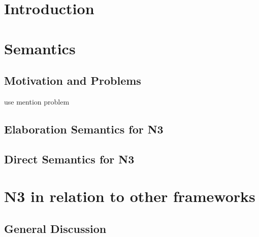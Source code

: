 \documentclass[11pt,a4paper,twoside]{book}
\newcommand\blankpage{%
    \null
    \thispagestyle{empty}%
    \addtocounter{page}{-1}%
    \newpage}
\theoremstyle{remark}
\begin{document}
    
    

    \printglossary[title=List of Abbreviations and Glossary] %

	


\mainmatter

\part{Introduction} \label{intro}





\part{Semantics}\label{semantics}

\chapter{Motivation and Problems}\label{problem}
use mention problem
%
%
%
\chapter{Elaboration Semantics for N3}\label{ela}
\chapter{Direct Semantics for N3}\label{exsem}


\part{N3 in relation to other frameworks}\label{others}
\chapter{General Discussion}\label{gen}
\end{document}

